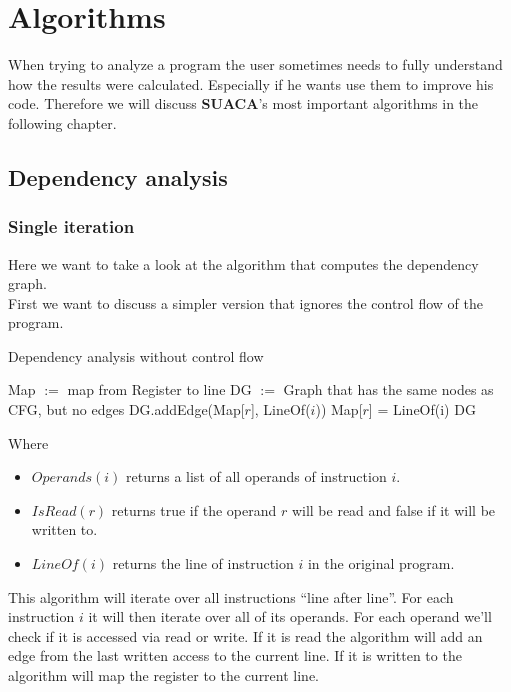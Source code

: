 \documentclass[a4paper,12pt,titlepage, twoside]{report}
\newcommand{\suaca}{\textbf{SUACA}}
\begin{document}
\chapter{Algorithms}

When trying to analyze a program the user sometimes needs to fully understand how the results were calculated. Especially if he wants use them to improve his code. Therefore we will discuss \suaca's most important algorithms in the following chapter.

\section{Dependency analysis}
\label{sec:depanalysis}

\subsection{Single iteration}

Here we want to take a look at the algorithm that computes the dependency graph. \\
First we want to discuss a simpler version that ignores the control flow of the program.

\begin{algorithm}[H]
    \SetAlgoLined
    \caption{Dependency analysis without control flow}
    Map $:=$ map from Register to line\;
    DG $:=$ Graph that has the same nodes as CFG, but no edges\;
     {
          {
              {
                 DG.addEdge(Map[$r$], LineOf($i$))\;
             }{
                Map[$r$] = LineOf(i)\;
            }
        }
    }
    \Return DG\;
\end{algorithm}

Where
\begin{itemize}
    \item $Operands(i)$ returns a list of all operands of instruction $i$.
    \item $IsRead(r)$ returns true if the operand $r$ will be read and false if it will be written to.
    \item $LineOf(i)$ returns the line of instruction $i$ in the original program.
\end{itemize}

This algorithm will iterate over all instructions ``line after line''. For each instruction $i$ it will then iterate over all of its operands. For each operand we'll check if it is accessed via read or write. If it is read the algorithm will add an edge from the last written access to the current line. If it is written to the algorithm will map the register to the current line.\\
\end{document}
